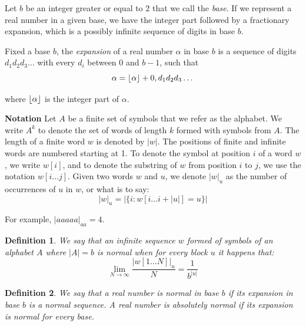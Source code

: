\documentclass[11pt,a4paper]{tesis}
\newtheorem{theorem}{Theorem}[]
\newtheorem{definition}{Definition}[]
\DeclarePairedDelimiter{\floor}{\lfloor}{\rfloor}
\newcommand{\note}[1]{\textbf{\color{red}{#1}}}
\begin{document}
Let $b$ be an integer greater or equal to 2 that we call the \textit{base}. If we represent a real number in a given base, we have the integer part followed by a fractionary expansion, which is a possibly infinite sequence of digits in base $b$.

Fixed a base $b$, the \textit{expansion} of a real number $\alpha$ in base $b$ is a sequence of digits $d_1d_2d_3\dots$ with every $d_i$ between 0 and $b-1$, such that
$$\alpha = \floor{\alpha} + 0,d_1d_2d_3\dots$$

where $\floor{\alpha}$ is the integer part of $\alpha$.

\textbf{Notation}
Let $A$ be a finite set of symbols that we refer as the alphabet. We write $A^k$ to denote the set of words of length $k$ formed with symbols from $A$. The length of a finite word $w$ is denoted by $|w|$.
The positions of finite and infinite words are numbered starting at 1. To denote the symbol at position $i$ of a word $w$, we write $w[i]$, and to denote the substring of $w$ from position $i$ to $j$, we use the notation $w[i \dots j]$.  
Given two words $w$ and $u$, we denote $|w|_u$ as the number of occurrences of $u$ in $w$, or what is to say:
    $$|w|_u = |\{i: w[i \dots i + |u|] = u\}|$$

For example, $|aaaaa|_{aa} = 4$.
\\

\begin{definition}
    We say that an infinite sequence $w$ formed of symbols of an alphabet $A$ where $|A| = b$ is \textit{normal} when for every block $u$ it happens that:
    $$\lim_{N\to\infty} \frac{|w[1 \dots N]|_u}{N} = \frac{1}{b^{|u|}}$$
\end{definition}

\begin{definition}
    We say that a real number is {\em normal} in base $b$ if its expansion in base $b$ is a normal sequence. 
    A real number is \textit{absolutely normal} if its expansion is normal for every base.
\end{definition}


\end{document}
